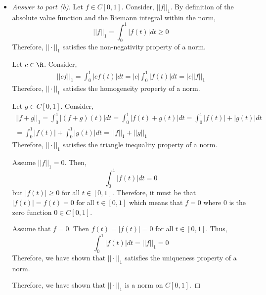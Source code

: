 \documentclass[10pt,twoside]{article}
\begin{document}
\begin{itemize}
\begin{itemize}
        \item\begin{proof}[Answer to part (b)]
        
        Let $f\in C[0,1]$. Consider, $||f||_1$. By definition of the absolute value function and the Riemann integral within the norm,
        \[||f||_1 = \int_{0}^1 |f(t)|dt \geq 0\]
        Therefore, $||\cdot||_1$ satisfies the non-negativity property of a norm.\smallskip
        
        Let $c\in \R$. Consider,
        \begin{gather*}
            ||cf||_1 = \int_{0}^1 |cf(t)|dt = |c|\int_{0}^1 |f(t)|dt = |c||f||_1
        \end{gather*}
        Therefore, $||\cdot||_1$ satisfies the homogeneity property of a norm.\smallskip
        
        Let $g\in C[0,1]$. Consider,
        \begin{gather*}
            ||f + g||_1 = \int_0^1 |(f+g)(t)|dt = \int_{0}^1 |f(t) + g(t)|dt = \int_0^1 |f(t)| + |g(t)|dt \\
            = \int_0^1|f(t)| + \int_0^1 |g(t)|dt = ||f||_1 + ||g||_1
        \end{gather*}
        Therefore, $||\cdot||_1$ satisfies the triangle inequality property of a norm.\smallskip
        
        Assume $||f||_1 = 0$. Then,
        \[\int_0^1 |f(t)|dt = 0\]
        but $|f(t)|\geq 0$ for all $t\in [0,1]$. Therefore, it must be that $|f(t)| = f(t) = 0$ for all $t\in[0,1]$ which means that $f = 0$ where $0$ is the zero function $0\in C[0,1]$.\smallskip
        
        Assume that $f = 0$. Then $f(t) = |f(t)| =  0$ for all $t\in [0,1]$. Thus, 
        \[\int_{0}^1 |f(t)|dt = ||f||_1 = 0\]
        Therefore, we have shown that $||\cdot||_1$ satisfies the uniqueness property of a norm.\medskip
        
        Therefore, we have shown that $||\cdot||_1$ is a norm on $C[0,1]$.
        
        \end{proof}
        
    \end{itemize}
\end{itemize}

\label{LastPage}
\end{document}
